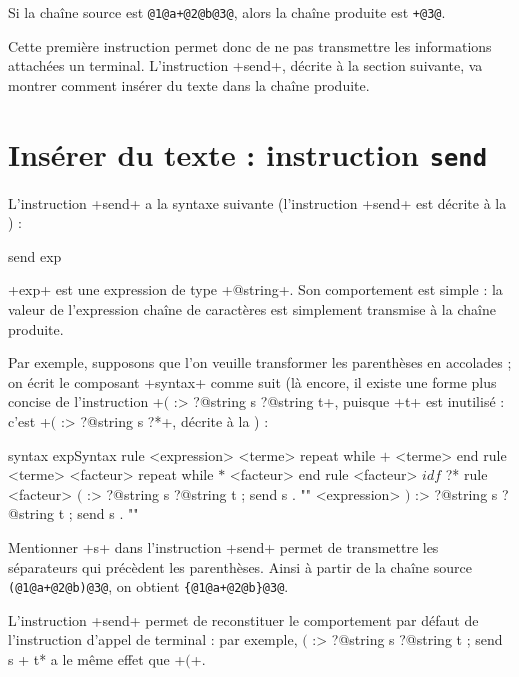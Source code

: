 Si la chaîne source est \texttt{@1@a+@2@b@3@}, alors la chaîne produite est \texttt{+@3@}.

Cette première instruction permet donc de ne pas transmettre les informations attachées un terminal. L'instruction \ggs+send+, décrite à la section suivante, va montrer comment insérer du texte dans la chaîne produite.










\section{Insérer du texte : instruction \texttt{send}}

L'instruction \ggs+send+ a la syntaxe suivante (l'instruction \ggs+send+ est décrite à la ) :

\begin{galgas}
send exp
\end{galgas}

\ggs+exp+ est une expression de type \ggs+@string+. Son comportement est simple : la valeur de l'expression chaîne de caractères est simplement transmise à la chaîne produite.

Par exemple, supposons que l'on veuille transformer les parenthèses en accolades ; on écrit le composant \ggs+syntax+ comme suit (là encore, il existe une forme plus concise de l'instruction \ggs+$($ :> ?@string s ?@string t+, puisque \ggs+t+ est inutilisé : c'est \ggs+$($ :> ?@string s ?*+, décrite  à la ) :
\begin{galgas}
syntax expSyntax {
  rule <expression> {
    <terme>
    repeat while $+$ <terme> end
  }
  rule <terme> {
    <facteur>
    repeat while $*$ <facteur> end
  }
  rule <facteur> {
    $idf$ ?*
  }
  rule <facteur> {
    $($ :> ?@string s ?@string t ; send s . "{"
    <expression>
    $)$ :> ?@string s ?@string t ; send s . "}"
  }
}
\end{galgas}

Mentionner \ggs+s+ dans l'instruction \ggs+send+ permet de transmettre les séparateurs qui précèdent les parenthèses. Ainsi à partir de la chaîne source \texttt{(@1@a+@2@b)@3@}, on obtient \texttt{\{@1@a+@2@b\}@3@}.


L'instruction \ggs+send+ permet de reconstituer le comportement par défaut de l'instruction d'appel de terminal : par exemple, \ggs*$($ :> ?@string s ?@string t ; send s + t* a le même effet que \ggs+$($+.


